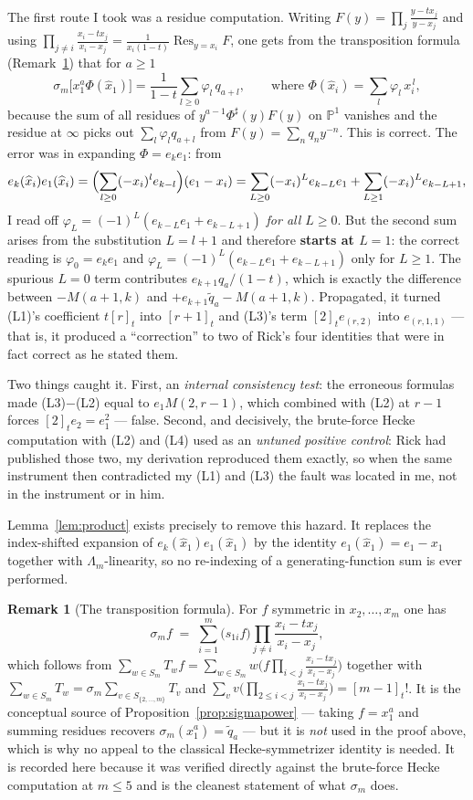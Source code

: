 \documentclass[11pt]{article}
\theoremstyle{plain}
\theoremstyle{definition}
\newtheorem{remark}[theorem]{Remark}
\newcommand{\qt}[1]{[#1]_t}
\newcommand{\hx}{\widehat{x}}
\newcommand{\Lm}{\Lambda_m}
\newcommand{\sm}{\sigma_m}
\newcommand{\qq}{\widetilde{q}}
\begin{document}
The first route I took was a residue computation. Writing
$F(y)=\prod_{j}\frac{y-tx_j}{y-x_j}$ and using
$\prod_{j\ne i}\frac{x_i-tx_j}{x_i-x_j}=\frac{1}{x_i(1-t)}\operatorname{Res}_{y=x_i}F$,
one gets from the transposition formula (Remark~\ref{rem:transp}) that for $a\ge1$
\[
  \sm\bigl[x_1^{a}\Phi(\hx_1)\bigr]=\frac{1}{1-t}\sum_{l\ge0}\varphi_l\,q_{a+l},
  \qquad\text{where } \Phi(\hx_i)=\sum_{l}\varphi_l\,x_i^{\,l},
\]
because the sum of all residues of $y^{a-1}\Phi^\sharp(y)F(y)$ on $\mathbb P^1$ vanishes and the
residue at $\infty$ picks out $\sum_l\varphi_lq_{a+l}$ from $F(y)=\sum_n q_ny^{-n}$.
This is correct. The error was in expanding $\Phi=e_{k}e_1$: from
\[
  e_k(\hx_i)e_1(\hx_i)=\Bigl(\sum_{l\ge0}(-x_i)^{l}e_{k-l}\Bigr)(e_1-x_i)
   =\sum_{L\ge0}(-x_i)^{L}e_{k-L}e_1+\sum_{L\ge1}(-x_i)^{L}e_{k-L+1},
\]
I read off $\varphi_L=(-1)^L(e_{k-L}e_1+e_{k-L+1})$ \emph{for all $L\ge0$}. But the second sum
arises from the substitution $L=l+1$ and therefore \textbf{starts at $L=1$}: the correct reading is
$\varphi_0=e_ke_1$ and $\varphi_L=(-1)^L(e_{k-L}e_1+e_{k-L+1})$ only for $L\ge1$.
The spurious $L=0$ term contributes $e_{k+1}q_a/(1-t)$, which is exactly the difference between
$-M(a+1,k)$ and $+e_{k+1}\qq_a-M(a+1,k)$. Propagated, it turned (L1)'s coefficient
$t\qt{r}$ into $\qt{r+1}$ and (L3)'s term $\qt2 e_{(r,2)}$ into $e_{(r,1,1)}$ --- that is, it
produced a ``correction'' to two of Rick's four identities that were in fact correct as
he stated them.

Two things caught it. First, an \emph{internal consistency test}: the erroneous formulas made
(L3)$-$(L2) equal to $e_1M(2,r-1)$, which combined with (L2) at $r-1$ forces
$\qt2 e_2=e_1^2$ --- false. Second, and decisively, the brute-force Hecke computation with
(L2) and (L4) used as an \emph{untuned positive control}: Rick had published those two, my
derivation reproduced them exactly, so when the same instrument then contradicted my (L1) and
(L3) the fault was located in me, not in the instrument or in him.

Lemma~\ref{lem:product} exists precisely to remove this hazard. It replaces the index-shifted
expansion of $e_k(\hx_1)e_1(\hx_1)$ by the identity $e_1(\hx_1)=e_1-x_1$ together with
$\Lm$-linearity, so no re-indexing of a generating-function sum is ever performed.

\begin{remark}[The transposition formula]\label{rem:transp}
For $f$ symmetric in $x_2,\dots,x_m$ one has
\[
  \sm f\;=\;\sum_{i=1}^{m}\bigl(s_{1i}f\bigr)\prod_{j\ne i}\frac{x_i-tx_j}{x_i-x_j},
\]
which follows from $\sum_{w\in S_m}T_w f=\sum_{w\in S_m}w\bigl(f\prod_{i<j}\frac{x_i-tx_j}{x_i-x_j}\bigr)$
together with $\sum_{w\in S_m}T_w=\sm\sum_{v\in S_{\{2,\dots,m\}}}T_v$ and
$\sum_{v}v\bigl(\prod_{2\le i<j}\frac{x_i-tx_j}{x_i-x_j}\bigr)=\qt{m-1}!$.
It is the conceptual source of Proposition~\ref{prop:sigmapower} --- taking $f=x_1^a$ and
summing residues recovers $\sm(x_1^a)=\qq_a$ --- but it is \emph{not} used in the proof above,
which is why no appeal to the classical Hecke-symmetrizer identity is needed. It is recorded
here because it was verified directly against the brute-force Hecke computation at
$m\le5$ and is the cleanest statement of what $\sm$ does.
\end{remark}
\end{document}
